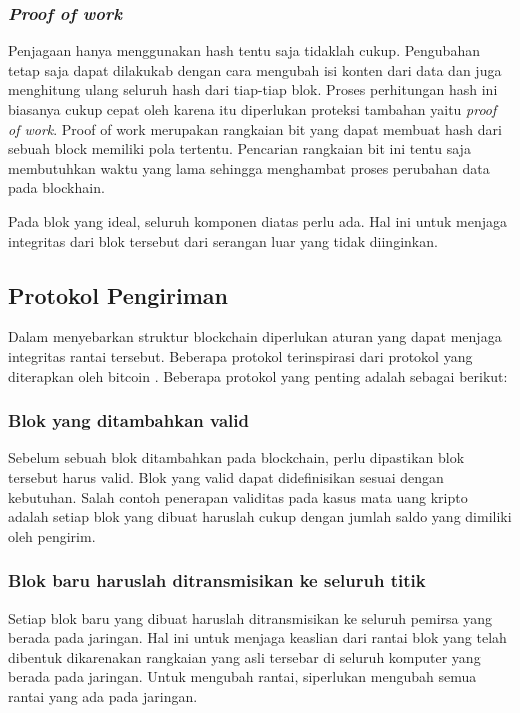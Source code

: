 \documentclass[10pt,conference]{IEEEtran}
\theoremstyle{definition}
\begin{document}
    \subsubsection{\emph{Proof of work}} 
    Penjagaan hanya menggunakan hash tentu saja tidaklah cukup. Pengubahan tetap saja dapat  dilakukab dengan cara mengubah isi konten dari data dan juga menghitung ulang seluruh hash dari tiap-tiap blok. Proses perhitungan hash ini biasanya cukup cepat oleh karena itu diperlukan proteksi tambahan yaitu \emph{proof of work}. Proof of work merupakan rangkaian bit yang dapat membuat hash dari sebuah block memiliki pola tertentu. Pencarian rangkaian bit ini tentu saja membutuhkan waktu yang lama sehingga menghambat proses perubahan data pada blockhain.

    
Pada blok yang ideal, seluruh komponen diatas perlu ada. Hal ini untuk menjaga integritas dari blok tersebut dari serangan luar yang tidak diinginkan.

\subsection{Protokol Pengiriman}
Dalam menyebarkan struktur blockchain diperlukan aturan yang dapat menjaga integritas rantai tersebut. Beberapa protokol terinspirasi dari protokol yang diterapkan oleh bitcoin \cite{a2}. Beberapa protokol yang penting adalah sebagai berikut:

\subsubsection{Blok yang ditambahkan valid}
Sebelum sebuah blok ditambahkan pada blockchain, perlu dipastikan blok tersebut harus valid. Blok yang valid dapat didefinisikan sesuai dengan kebutuhan. Salah contoh penerapan validitas pada kasus mata uang kripto adalah setiap blok yang dibuat haruslah cukup dengan jumlah saldo yang dimiliki oleh pengirim.

\subsubsection{Blok baru haruslah ditransmisikan ke seluruh titik}
Setiap blok baru yang dibuat haruslah ditransmisikan ke seluruh pemirsa yang berada pada jaringan. Hal ini untuk menjaga keaslian dari rantai blok yang telah dibentuk dikarenakan rangkaian yang asli tersebar di seluruh komputer  yang berada pada jaringan. Untuk mengubah rantai, siperlukan mengubah semua rantai yang ada pada jaringan.
\end{document}
